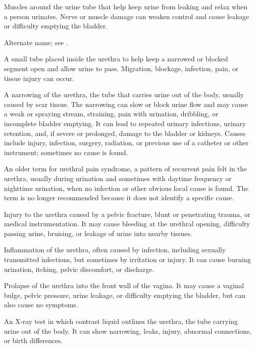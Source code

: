  Muscles around the urine tube that help keep urine from leaking and relax when a person urinates. Nerve or muscle damage can weaken control and cause leakage or difficulty emptying the bladder.

 Alternate name; see .

 A small tube placed inside the urethra to help keep a narrowed or blocked segment open and allow urine to pass. Migration, blockage, infection, pain, or tissue injury can occur.

 A narrowing of the urethra, the tube that carries urine out of the body, usually caused by scar tissue. The narrowing can slow or block urine flow and may cause a weak or spraying stream, straining, pain with urination, dribbling, or incomplete bladder emptying. It can lead to repeated urinary infections, urinary retention, and, if severe or prolonged, damage to the bladder or kidneys. Causes include injury, infection, surgery, radiation, or previous use of a catheter or other instrument; sometimes no cause is found.

 An older term for urethral pain syndrome, a pattern of recurrent pain felt in the urethra, usually during urination and sometimes with daytime frequency or nighttime urination, when no infection or other obvious local cause is found. The term is no longer recommended because it does not identify a specific cause.

 Injury to the urethra caused by a pelvic fracture, blunt or penetrating trauma, or medical instrumentation. It may cause bleeding at the urethral opening, difficulty passing urine, bruising, or leakage of urine into nearby tissues.

 Inflammation of the urethra, often caused by infection, including sexually transmitted infections, but sometimes by irritation or injury. It can cause burning urination, itching, pelvic discomfort, or discharge.

 Prolapse of the urethra into the front wall of the vagina. It may cause a vaginal bulge, pelvic pressure, urine leakage, or difficulty emptying the bladder, but can also cause no symptoms.

 An X-ray test in which contrast liquid outlines the urethra, the tube carrying urine out of the body. It can show narrowing, leaks, injury, abnormal connections, or birth differences.

